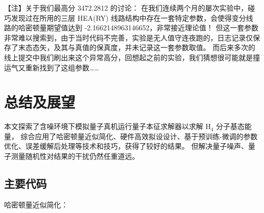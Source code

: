 \documentclass[withoutpreface,bwprint]{cumcmthesis}
\begin{document}
【注】关于我们最高分 3472.2812 的讨论：
在我们连续两个月的屡次实验中，碰巧发现过在所用的三层 HEA(RY) 线路结构中存在一套特定参数，会使得变分线路的哈密顿量期望值达到 -2.1662148963146652，非常接近理论值！
但这一套参数非常难以搜索到，由于当时代码不完善，实验是无人值守连夜跑的，日志记录仅保存了末态态矢，及其与真值的保真度，并未记录这一套参数取值。
而后来多次的线上提交中我们刷出来这个异常高分，回想起之前的实验，我们猜想很可能就是撞运气又重新找到了这组参数……


\section{总结及展望}

本文探索了含噪环境下模拟量子真机运行量子本征求解器以求解 $ \mathrm{H}_4 $ 分子基态能量，
综合应用了哈密顿量近似简化、硬件高效拟设设计、基于预训练-微调的参数优化、误差缓解后处理等技术和技巧，获得了较好的结果。
但解决量子噪声、量子测量随机性对结果的干扰仍然任重道远。


\newpage
\nocite{*}


\newpage
\begin{appendices}

\section{主要代码}

哈密顿量近似简化：



\end{appendices}
\end{document}
